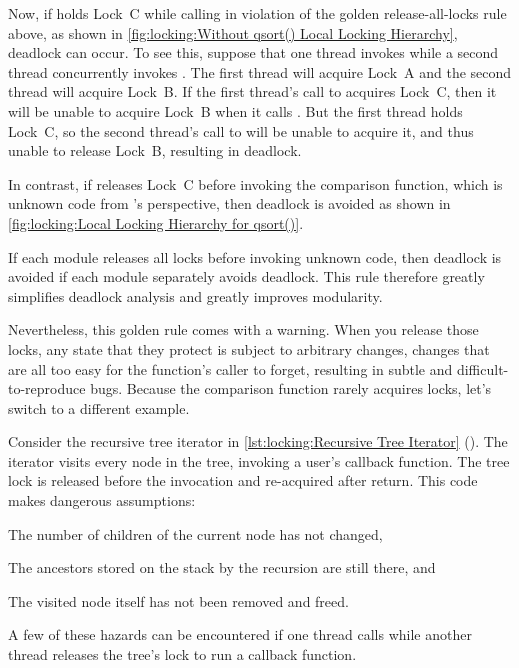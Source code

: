 Now, if  holds Lock~C while calling  in violation
of the golden release-all-locks rule above, as shown in
\cref{fig:locking:Without qsort() Local Locking Hierarchy},
deadlock can occur.
To see this, suppose that one thread invokes  while a second
thread concurrently invokes .
The first thread will acquire Lock~A and the second thread will acquire
Lock~B\@.
If the first thread's call to  acquires Lock~C, then it
will be unable to acquire Lock~B when it calls .
But the first thread holds Lock~C, so the second thread's call to
 will be unable to acquire it, and thus unable to release
Lock~B, resulting in deadlock.

In contrast, if  releases Lock~C before invoking the
comparison function, which is unknown code from 's perspective,
then deadlock is avoided as shown in
\cref{fig:locking:Local Locking Hierarchy for qsort()}.

If each module releases all locks before invoking unknown code, then
deadlock is avoided if each module separately avoids deadlock.
This rule therefore greatly simplifies deadlock analysis and greatly
improves modularity.

Nevertheless, this golden rule comes with a warning.
When you release those locks, any state that they protect is subject
to arbitrary changes, changes that are all too easy for the function's
caller to forget, resulting in subtle and difficult-to-reproduce bugs.
Because the  comparison function rarely acquires locks,
let's switch to a different example.

Consider the recursive tree iterator in
\cref{lst:locking:Recursive Tree Iterator} ().
The iterator visits every node in the tree, invoking a user's callback
function.
The tree lock is released before the invocation and re-acquired after return.
This code makes dangerous assumptions:
\begin{enumerate*}[(1)]
\item	The number of children of the current node has not changed,
\item	The ancestors stored on the stack by the recursion are still
	there, and
\item	The visited node itself has not been removed and freed.
\end{enumerate*}
A few of these hazards can be encountered if one thread calls
 while another thread releases the tree's lock to run a
callback function.

